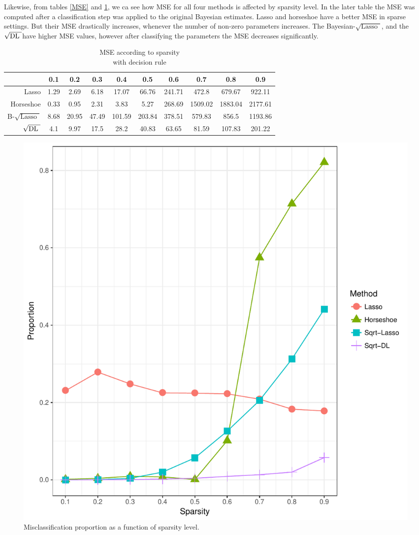\documentclass[chapters]{uamaththesis}
\def\sql{$\sqrt{\text{Lasso }}$}
\def\sqdl{$\sqrt{\text{\rm{DL} }}$}
\begin{document}
Likewise, from tables \ref{MSE} and \ref{MSE_dec}, we ca see how MSE for all four methods is affected by sparsity level. In the later table the MSE was computed after a classification step was applied to the original Bayesian estimates. Lasso and horseshoe have a better MSE in sparse settings. But their MSE drastically increases, whenever the number of non-zero parameters increases. The Bayesian-\sql, and the \sqdl have higher MSE values, however after classifying the parameters the MSE decreases significantly. 



\begin{table}[h!]
\caption{MSE according to sparsity\\ with decision rule}\label{MSE_dec}
\begin{center}
\begin{tabular}{c|c|c|c|c|c|c|c|c|c|}
\cline{2-10}
    & 0.1  &  0.2  &  0.3  &  0.4  &  0.5 &   0.6  &  0.7  &  0.8 &   0.9 	\\
\hline
\multicolumn{1}{|r|}{Lasso} & 1.29 &  2.69 &  6.18 &  17.07 & 66.76 &  241.71 & 472.8 &  679.67 &  922.11	\\
\hline
\multicolumn{1}{|r|}{Horseshoe} &   0.33 & 0.95 &  2.31 &  3.83 &   5.27 &   268.69 & 1509.02 & 1883.04 & 2177.61 \\
\hline
\multicolumn{1}{|r|}{B-\sql} & 8.68 & 20.95 & 47.49 & 101.59 & 203.84 & 378.51 & 579.83 &  856.5 &   1193.86 \\
\hline
\multicolumn{1}{|r|}{\sqdl} &4.1 &  9.97 &  17.5 &  28.2 &   40.83 &  63.65 &  81.59 &   107.83 &  201.22 \\
\hline
\end{tabular}
\end{center}

\end{table}

\begin{figure}
\centering
\includegraphics[height = .37\textheight , width = .7\linewidth]{Sparsity_MSP_n=p}
\caption{Misclassification proportion as a function of sparsity level.}
\label{fig:msp}
\end{figure}
\end{document}
